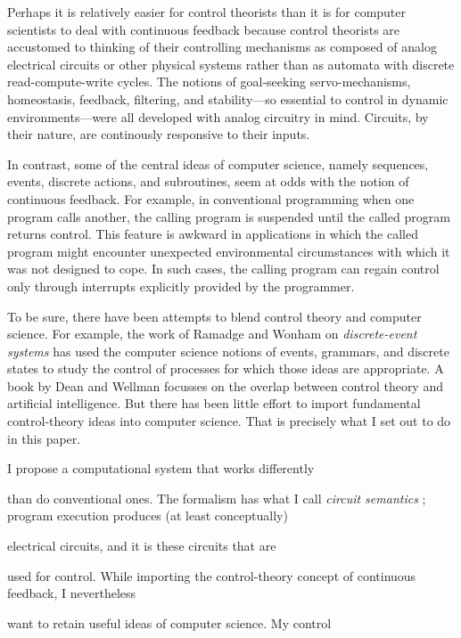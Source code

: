 Perhaps it is relatively easier for control theorists than it is for computer  
scientists to deal with continuous feedback because control theorists are  
accustomed to thinking of their controlling mechanisms as composed of analog  
electrical circuits or other physical systems rather than as automata with  
discrete read-compute-write cycles.  The notions of goal-seeking  
servo-mechanisms, homeostasis, feedback, filtering, and stability---so  
essential to control in dynamic environments---were all developed with analog  
circuitry in mind. Circuits, by their nature, are continously responsive to  
their inputs.

In contrast, some of the central ideas of computer science, namely sequences,  
events, discrete actions, and subroutines, seem at odds with the notion of  
continuous feedback.  For example,  in conventional programming when one  
program calls another, the calling program is suspended until the called  
program returns control.  This feature is awkward in applications in which  
the called program might encounter unexpected environmental circumstances  
with which it was not designed to cope.  In such cases, the calling program  
can regain control only through interrupts explicitly provided by the  
programmer.

To be sure, there have been attempts to blend control theory and computer  
science.   For example, the work of Ramadge and Wonham \cite{Ramadge} on {\it  
discrete-event systems} has used the computer science notions of events,  
grammars, and discrete states to study the control of processes for which  
those ideas are appropriate.  A  book by Dean and Wellman \cite{Dean}  
focusses on the overlap between control theory and artificial intelligence.   
But there has been little effort to import fundamental control-theory ideas  
into computer science.  That is precisely what I set out to do in this paper.

I propose a computational system that works differently 

than do conventional ones.  The formalism has what I call {\it circuit  
semantics} \cite{Nilsson}; program execution produces (at least conceptually) 

electrical circuits, and it is these circuits that are 

used for control. While importing the control-theory concept of continuous  
feedback, I nevertheless 

want to retain useful ideas of computer science.  My control 

